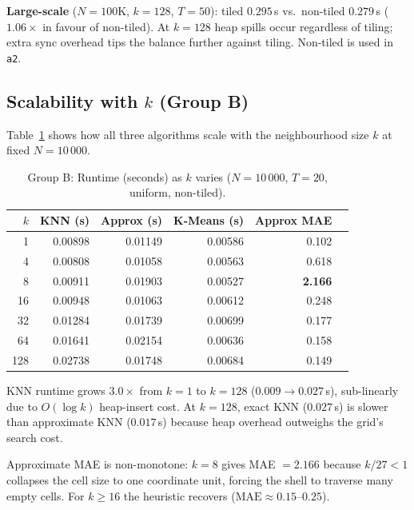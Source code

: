 \documentclass[11pt,a4paper]{article}
\begin{document}
\noindent\textbf{Large-scale} ($N=100\text{K}$, $k=128$, $T=50$): tiled
$0.295$\,s vs.\ non-tiled $0.279$\,s ($1.06\times$ in favour of non-tiled).
At $k=128$ heap spills occur regardless of tiling; extra sync overhead tips
the balance further against tiling.  Non-tiled is used in \texttt{a2}.

\subsection{Scalability with \texorpdfstring{$k$}{k} (Group B)}

Table~\ref{tab:vary_k} shows how all three algorithms scale with the
neighbourhood size $k$ at fixed $N=10\,000$.

\begin{table}[H]
\centering
\caption{Group B: Runtime (seconds) as $k$ varies ($N=10\,000$, $T=20$,
uniform, non-tiled).}
\label{tab:vary_k}
\begin{tabular}{rrrrrr}
\toprule
$k$ & KNN (s) & Approx (s) & K-Means (s) & Approx MAE \\
\midrule
1   & 0.00898 & 0.01149 & 0.00586 & 0.102 \\
4   & 0.00808 & 0.01058 & 0.00563 & 0.618 \\
8   & 0.00911 & 0.01903 & 0.00527 & \textbf{2.166} \\
16  & 0.00948 & 0.01063 & 0.00612 & 0.248 \\
32  & 0.01284 & 0.01739 & 0.00699 & 0.177 \\
64  & 0.01641 & 0.02154 & 0.00636 & 0.158 \\
128 & 0.02738 & 0.01748 & 0.00684 & 0.149 \\
\bottomrule
\end{tabular}
\end{table}

KNN runtime grows $3.0\times$ from $k=1$ to $k=128$ ($0.009 \to 0.027$\,s),
sub-linearly due to $O(\log k)$ heap-insert cost.  At $k=128$, exact KNN
($0.027$\,s) is slower than approximate KNN ($0.017$\,s) because heap overhead
outweighs the grid's search cost.

Approximate MAE is non-monotone: $k=8$ gives MAE $= 2.166$ because
$k/27 < 1$ collapses the cell size to one coordinate unit, forcing the shell
to traverse many empty cells.  For $k \ge 16$ the heuristic recovers
($\text{MAE} \approx 0.15$--$0.25$).
\end{document}
